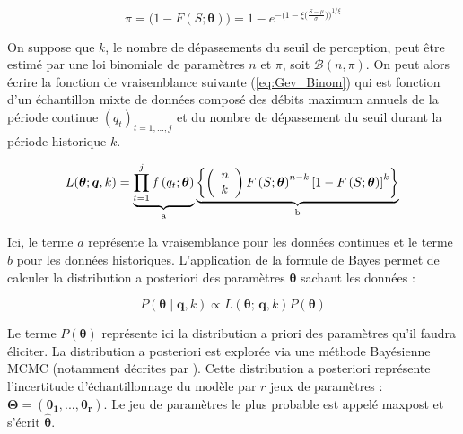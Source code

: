 \documentclass[11pt]{article}
\begin{document}
		\begin{equation}
			\pi = \biggl( 1 - F(S;\boldsymbol{\theta})\biggl) = 1 - e^{-\biggl(1-\xi\bigl(\frac{S-\mu}{\sigma}\bigl)\biggl)^{1/\xi} }		
		\end{equation}
			 
	On suppose que $k$, le nombre de dépassements du seuil de perception, peut être estimé par une loi binomiale de paramètres $n$ et $\pi$, soit $\mathcal{B}(n,\pi)$. On peut alors écrire la fonction de vraisemblance suivante (\ref{eq:Gev_Binom}) qui est fonction d'un échantillon mixte de données composé des débits maximum annuels de la période continue $(q_t)_{t=1,...,j}$ et du nombre de dépassement du seuil durant la période historique $k$.
		
			\begin{equation}
			L(\boldsymbol{\theta} ; \boldsymbol{q}, k) = \underbrace{\prod_{t=1}^j f\left(q_t;\boldsymbol{\theta}\right)}_{\mathrm{a}} \underbrace{\left\{\left(\begin{array}{l}
			n \\
			k
			\end{array}\right) F\left(S;\boldsymbol{\theta}\right)^{n-k}\left[1-F\left(S;\boldsymbol{\theta}\right)\right]^k\right\}}_{\mathrm{b}} \\
			\label{eq:Gev_Binom}
			\end{equation}
			
			Ici, le terme $a$ représente la vraisemblance pour les données continues et le terme $b$ pour les données historiques. L'application de la formule de Bayes permet de calculer la distribution a posteriori des paramètres $\boldsymbol{\theta}$ sachant les données :
			
			\begin{equation}
				P(\boldsymbol{\theta} \mid \boldsymbol{q},k) \propto L(\boldsymbol{\theta};\,\boldsymbol{q},k) P(\boldsymbol{\theta})
				\label{eq:BayesBinom}
			\end{equation}
	
		Le terme $P(\boldsymbol{\theta})$ représente ici la distribution a priori des paramètres qu'il faudra éliciter. La distribution a posteriori est explorée via une méthode Bayésienne MCMC (notamment décrites par \citet{coles_classical_2001}). Cette distribution a posteriori représente l'incertitude d'échantillonnage du modèle par $r$ jeux de paramètres : $\boldsymbol{\Theta} = (\boldsymbol{\theta_1},...,\boldsymbol{\theta_r})$. Le jeu de paramètres le plus probable est appelé maxpost et s'écrit $\boldsymbol{ \hat{\theta} }$.
	
\end{document}
